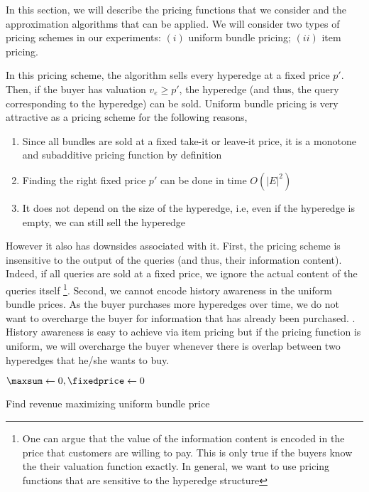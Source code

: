 In this section, we will describe the pricing functions that we consider and the approximation algorithms that can be applied. We will consider two types of pricing schemes in our experiments: $(i)$ uniform bundle pricing; $(ii)$ item pricing. 

\smallskip
{} In this pricing scheme, the algorithm sells every hyperedge at a fixed price $p'$. Then, if the buyer has valuation $v_e \geq p'$, the hyperedge (and thus, the query corresponding to the hyperedge) can be sold. Uniform bundle pricing is very attractive as a pricing scheme for the following reasons, 

\begin{enumerate}
	\item Since all bundles are sold at a fixed take-it or leave-it price, it is a monotone and subadditive pricing function by definition
	\item Finding the right fixed price $p'$ can be done in time  $O(|E|^{2})$
	\item It does not depend on the size of the hyperedge, i.e, even if the hyperedge is empty, we can still sell the hyperedge
\end{enumerate}

However it also has downsides associated with it. First, the pricing scheme is insensitive to the output of the queries (and thus, their information content). Indeed, if all queries are sold at a fixed price, we ignore the actual content of the queries itself \footnote{One can argue that the value of the information content is encoded in the price that customers are willing to pay. This is only true if the buyers know the their valuation function exactly. In general, we want to use pricing functions that are sensitive to the hyperedge structure}. Second, we cannot encode history awareness in the uniform bundle prices. As the buyer purchases more hyperedges over time, we do not want to overcharge the buyer for information that has already been purchased. . History awareness is easy to achieve via item pricing but if the pricing function is uniform, we will overcharge the buyer whenever there is overlap between two hyperedges that he/she wants to buy.

\begin{algorithm}[!htp]
	\DontPrintSemicolon 
	\BlankLine
	$\maxsum \leftarrow 0, \fixedprice \leftarrow 0$ \\

	\KwRet{$\fixedprice$}
	\caption{Find revenue maximizing uniform bundle price}
	\label{algo:uniformbundleprice}
\end{algorithm}

